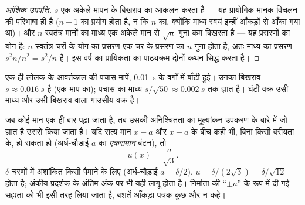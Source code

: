 \begin{proof}[आंशिक उपपत्ति]
$s$ एक अकेले मापन के बिखराव का आकलन करता है --- यह प्रायोगिक मानक विचलन की
परिभाषा ही है ($n - 1$ का प्रयोग होता है, न कि $n$ का, क्योंकि माध्य स्वयं
इन्हीं आँकड़ों से आँका गया था)। और $n$ स्वतंत्र मानों का माध्य एक अकेले मान से $\sqrt n$ गुना कम
बिखरता है --- यह प्रसरणों का योग है: $n$ स्वतंत्र चरों के योग का प्रसरण एक चर
के प्रसरण का $n$ गुना होता है, अतः माध्य का प्रसरण $s^2 n / n^2 = s^2/n$ है।
इस वर्ष का प्रायिकता का पाठ्यक्रम दोनों कथन सिद्ध करता है।
\end{proof}

\begin{omfigure}

{\small एक ही लोलक के आवर्तकाल की पचास मापें, \qty{0.01}{s} के वर्गों में
बाँटी हुई। उनका बिखराव $s \approx \qty{0.016}{s}$ है (एक माप का); पचास का
माध्य $s/\sqrt{50} \approx \qty{0.002}{s}$ तक ज्ञात है। घंटी वक्र उसी माध्य
और उसी बिखराव वाला गाउसीय वक्र है।}
\end{omfigure}

\begin{proposition}[प्रकार B का मूल्यांकन]\label{prop:b1:units-dimensions:typeB}
जब कोई मान एक ही बार पढ़ा जाता है, तब उसकी अनिश्चितता का मूल्यांकन उपकरण के
बारे में जो ज्ञात है उससे किया जाता है। यदि सत्य मान $x - a$ और $x + a$ के बीच
कहीं भी, बिना किसी वरीयता के, हो सकता हो (अर्ध-चौड़ाई $a$ का
\emph{एकसमान} बंटन), तो
\[
u(x) = \frac{a}{\sqrt 3} .
\]
$\delta$ चरणों में अंशांकित किसी पैमाने के लिए (अर्ध-चौड़ाई $a = \delta/2$),
$u = \delta/(2\sqrt3) = \delta/\sqrt{12}$ होता है; अंकीय प्रदर्शक के अंतिम अंक
पर भी यही लागू होता है। निर्माता की ``$\pm a$'' के रूप में दी गई सह्यता को भी
इसी तरह लिया जाता है, बशर्ते आँकड़ा-पत्रक कुछ और न कहे।
\end{proposition}

